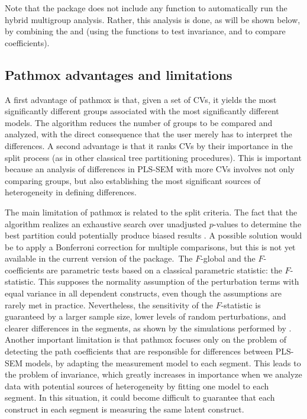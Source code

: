 Note that the  package does not include any function to automatically  run the hybrid multigroup analysis. Rather, this analysis is done, as will be shown below, by combining the  and  (using the functions   to test invariance, and   to compare coefficients). 

\subsection{Pathmox advantages and limitations}

A first advantage of pathmox is that, given a set of CVs, it yields the most significantly different groups associated with the most significantly different models. The algorithm reduces the number of groups to be compared and analyzed, with the direct consequence that the user merely has to interpret the differences. A second advantage is that it ranks CVs by their importance in the split process (as in other classical tree partitioning procedures). This is important because an analysis of differences in PLS-SEM with more CVs involves not only comparing groups, but also establishing the most significant sources of heterogeneity in defining differences.

The main limitation of pathmox is related to the split criteria. The fact that the algorithm realizes an exhaustive search over unadjusted $p$-values to determine the best partition could potentially produce biased results \citep{loh97}. A possible solution would be to apply a Bonferroni correction for multiple comparisons, but  this is not yet available in the current version of the package. The $F$-global and the $F$-coefficients are parametric tests based on a classical parametric statistic: the $F$-statistic. This supposes the normality assumption of the perturbation terms with equal variance in all dependent constructs, even though the assumptions are rarely met in practice. Nevertheless, the sensitivity of the $F$-statistic is guaranteed by a larger sample size, lower levels of random perturbations, and clearer differences in the segments, as shown by the simulations performed by \citet{Lamberti16, Lamberti17}.
Another important limitation is that pathmox focuses only on the problem of detecting the path coefficients that are responsible for differences between PLS-SEM models, by adapting the measurement model to each segment. This leads to the problem of invariance, which greatly increases in importance when we analyze data with potential sources of heterogeneity by fitting one model to each segment. In this situation, it could become difficult to guarantee that each construct in each segment is measuring the same latent construct.

